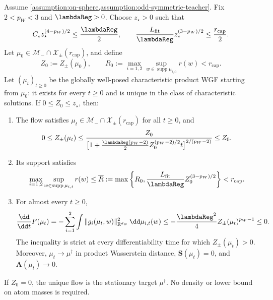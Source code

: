 \begin{proposition}
\label{prop:reduced-dissipation-antisymmetric-branch}
Assume \cref{assumption:on-sphere,assumption:odd-symmetric-teacher}.
Fix \(2<p_W<3\) and \(\lambdaReg>0\). Choose \(z_\star>0\) such that
\begin{equation}
\label{eq:mf-local-basin-threshold}
 C_\star z_\star^{(4-p_W)/2}\le\frac{\lambdaReg}{2},\qquad
 \frac{L_{\mathrm{fit}}}{\lambdaReg}z_\star^{(3-p_W)/2}
 \le\frac{r_{\mathrm{cap}}}{2}.
\end{equation}
Let \(\mu_0\in\mathcal M_-\cap\mathcal X_\pm(r_{\mathrm{cap}})\), and define
\begin{equation}
\label{eq:mf-local-initial-data}
 Z_0:=Z_\pm(\mu_0),\qquad
 R_0:=\max_{i=1,2}\sup_{w\in\operatorname{supp}\mu_{i,0}}r(w)
 <r_{\mathrm{cap}}.
\end{equation}
Let \((\mu_t)_{t\ge0}\) be the globally well-posed characteristic product WGF
starting from \(\mu_0\): it exists for every \(t\ge0\) and is unique in the
class of characteristic solutions. If \(0\le Z_0\le z_\star\), then:
\begin{enumerate}[label=(\roman*),leftmargin=*]
\item The flow satisfies
\(\mu_t\in\mathcal M_-\cap\mathcal X_\pm(r_{\mathrm{cap}})\) for all
\(t\ge0\), and
\begin{equation}
\label{eq:mf-local-distance-decay}
 0\le Z_\pm(\mu_t)\le
 \frac{Z_0}{\bigl[1+\tfrac{\lambdaReg(p_W-2)}2
                   Z_0^{(p_W-2)/2}t\bigr]^{2/(p_W-2)}}
 \le Z_0.
\end{equation}
\item Its support satisfies
\begin{equation}
\label{eq:mf-local-support-barrier}
 \max_{i=1,2}\sup_{w\in\operatorname{supp}\mu_{i,t}}r(w)
 \le\overline R:=\max\left\{R_0,
        \frac{L_{\mathrm{fit}}}{\lambdaReg}Z_0^{(3-p_W)/2}\right\}
 <r_{\mathrm{cap}}.
\end{equation}
\item For almost every \(t\ge0\),
\begin{equation}
\label{eq:mf-local-energy-dissipation}
 \frac{\dd}{\dd t}F(\mu_t)
 =-\sum_{i=1}^2\int
       \|g_i(\mu_t,w)\|_{\mathbb R^{d_w}}^2\,\dd\mu_{i,t}(w)
 \le-\frac{\lambdaReg^2}{4}Z_\pm(\mu_t)^{p_W-1}\le0.
\end{equation}
The inequality is strict at every differentiability time for which
\(Z_\pm(\mu_t)>0\). Moreover, \(\mu_t\to\mu^\dagger\) in product
Wasserstein distance, \(\mathbf S(\mu_t)=0\), and
\(\mathbf A(\mu_t)\to0\).
\end{enumerate}
If \(Z_0=0\), the unique flow is the stationary target \(\mu^\dagger\).
No density or lower bound on atom masses is required.
\end{proposition}

